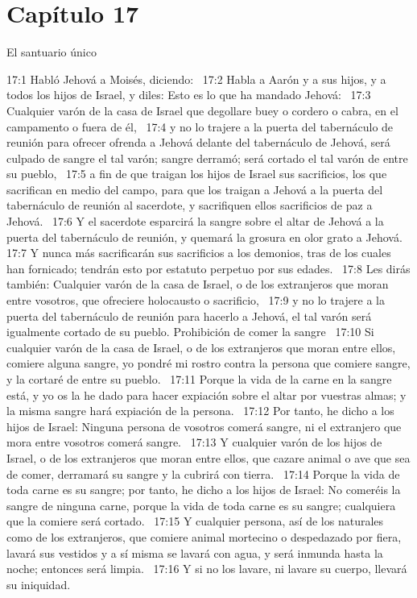 \section*{Capítulo 17}
El santuario único  

17:1 Habló Jehová a Moisés, diciendo:  
17:2 Habla a Aarón y a sus hijos, y a todos los hijos de Israel, y diles: Esto es lo que ha mandado Jehová:  
17:3 Cualquier varón de la casa de Israel que degollare buey o cordero o cabra, en el campamento o fuera de él,  
17:4 y no lo trajere a la puerta del tabernáculo de reunión para ofrecer ofrenda a Jehová delante del tabernáculo de Jehová, será culpado de sangre el tal varón; sangre derramó; será cortado el tal varón de entre su pueblo,  
17:5 a fin de que traigan los hijos de Israel sus sacrificios, los que sacrifican en medio del campo, para que los traigan a Jehová a la puerta del tabernáculo de reunión al sacerdote, y sacrifiquen ellos sacrificios de paz a Jehová.  
17:6 Y el sacerdote esparcirá la sangre sobre el altar de Jehová a la puerta del tabernáculo de reunión, y quemará la grosura en olor grato a Jehová.  
17:7 Y nunca más sacrificarán sus sacrificios a los demonios, tras de los cuales han fornicado; tendrán esto por estatuto perpetuo por sus edades.  
17:8 Les dirás también: Cualquier varón de la casa de Israel, o de los extranjeros que moran entre vosotros, que ofreciere holocausto o sacrificio,  
17:9 y no lo trajere a la puerta del tabernáculo de reunión para hacerlo a Jehová, el tal varón será igualmente cortado de su pueblo. 
Prohibición de comer la sangre  
17:10 Si cualquier varón de la casa de Israel, o de los extranjeros que moran entre ellos, comiere alguna sangre, yo pondré mi rostro contra la persona que comiere sangre, y la cortaré de entre su pueblo.  
17:11 Porque la vida de la carne en la sangre está, y yo os la he dado para hacer expiación sobre el altar por vuestras almas; y la misma sangre hará expiación de la persona.  
17:12 Por tanto, he dicho a los hijos de Israel: Ninguna persona de vosotros comerá sangre, ni el extranjero que mora entre vosotros comerá sangre.  
17:13 Y cualquier varón de los hijos de Israel, o de los extranjeros que moran entre ellos, que cazare animal o ave que sea de comer, derramará su sangre y la cubrirá con tierra.  
17:14 Porque la vida de toda carne es su sangre; por tanto, he dicho a los hijos de Israel: No comeréis la sangre de ninguna carne, porque la vida de toda carne es su sangre; cualquiera que la comiere será cortado.  
17:15 Y cualquier persona, así de los naturales como de los extranjeros, que comiere animal mortecino o despedazado por fiera, lavará sus vestidos y a sí misma se lavará con agua, y será inmunda hasta la noche; entonces será limpia.  
17:16 Y si no los lavare, ni lavare su cuerpo, llevará su iniquidad.  
